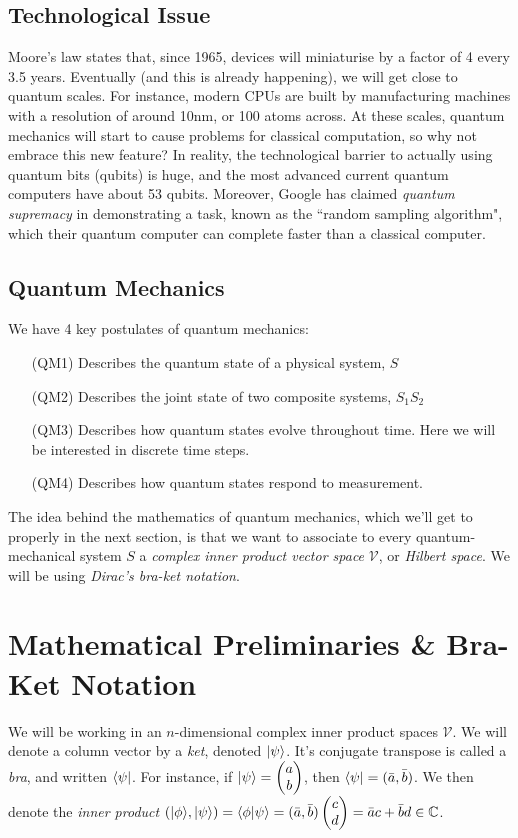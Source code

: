 \documentclass[10pt,a4paper]{article}
\begin{document}
\subsection{Technological Issue}
Moore's law states that, since 1965, devices will miniaturise by a factor of 4 every 3.5 years. Eventually (and this is already happening), we will get close to quantum scales. For instance, modern CPUs are built by manufacturing machines with a resolution of around 10nm, or 100 atoms across. At these scales, quantum mechanics will start to cause problems for classical computation, so why not embrace this new feature? In reality, the technological barrier to actually using quantum bits (qubits) is huge, and the most advanced current quantum computers have about 53 qubits. Moreover, Google has claimed \emph{quantum supremacy} in demonstrating a task, known as the ``random sampling algorithm", which their quantum computer can complete faster than a classical computer.

\subsection{Quantum Mechanics}
We have 4 key postulates of quantum mechanics:
\begin{itemize}
\item[(QM1)] Describes the quantum state of a physical system, $S$
\item[(QM2)] Describes the joint state of two composite systems, $S_1S_2$
\item[(QM3)] Describes how quantum states evolve throughout time. Here we will be interested in discrete time steps.
\item[(QM4)] Describes how quantum states respond to measurement.
\end{itemize}
The idea behind the mathematics of quantum mechanics, which we'll get to properly in the next section, is that we want to associate to every quantum-mechanical system $S$ a \emph{complex inner product vector space} $\mathcal{V}$, or \emph{Hilbert space}. We will be using \emph{Dirac's bra-ket notation}.

\section{Mathematical Preliminaries \& Bra-Ket Notation}
We will be working in an $n$-dimensional complex inner product spaces $\mathcal{V}$. We will denote a column vector by a \emph{ket}, denoted $|\psi\rangle$. It's conjugate transpose is called a \emph{bra}, and written $\langle \psi|$. For instance, if $|\psi\rangle = \begin{pmatrix} a \\ b \end{pmatrix}$, then $\langle \psi| = (\bar{a}, \bar{b})$. We then denote the \emph{inner product} $(|\phi\rangle, |\psi\rangle) = \langle \phi | \psi \rangle = (\bar{a}, \bar{b})\begin{pmatrix} c \\ d\end{pmatrix} = \bar{a}c+\bar{b}d \in \mathbb{C}$.
\end{document}
